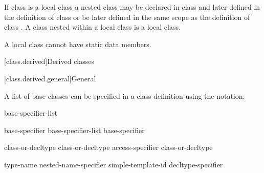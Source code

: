 \pnum
{}%
If class  is a local class a nested class  may be
declared in class  and later defined in the definition of class
 or be later defined in the same scope as the definition of
class .
%
A class nested within
a local class is a local class.

\pnum
{}%
\begin{note}
A local class cannot have static data members.
\end{note}

[class.derived]{Derived classes}%

[class.derived.general]{General}%


\pnum
{}%
%
%
A list of base classes can be specified in a class definition using
the notation:

\begin{bnf}
\br
    \terminal{:} base-specifier-list
\end{bnf}


\begin{bnf}
\br
    base-specifier \br
    base-specifier-list \terminal{,} base-specifier 
\end{bnf}

\begin{bnf}
\br
     class-or-decltype\br
       class-or-decltype\br
     access-specifier  class-or-decltype
\end{bnf}

\begin{bnf}
\br
     type-name\br
    nested-name-specifier  simple-template-id\br
    decltype-specifier
\end{bnf}

%
%
\begin{bnf}
\br
    \br
    \br
\end{bnf}

